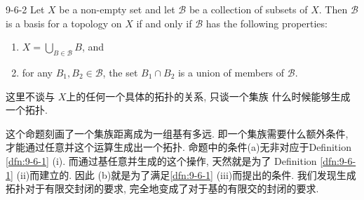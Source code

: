 \documentclass[../main.tex]{subfiles}
\begin{document}
\begin{proposition}{}{9-6-2}
Let $X$ be a non-empty set and let $\mathcal{B}$ be a collection of subsets of $X$. Then $\mathcal{B}$ is a basis for a topology on $X$ if and only if $\mathcal{B}$ has the following properties:
\begin{enumerate}
    \item[(a)] $X = \bigcup_{B \in \mathcal{B}} B$, and
    \item[(b)] for any $B_1, B_2 \in \mathcal{B}$, the set $B_1 \cap B_2$ is a union of members of $\mathcal{B}$.
\end{enumerate}
\end{proposition}
\begin{remark}
    这里不谈与 \(  X  \)上的任何一个具体的拓扑的关系, 只谈一个集族 什么时候能够生成一个拓扑. 
\end{remark}
\begin{note}
    这个命题刻画了一个集族距离成为一组基有多远. 即一个集族需要什么额外条件, 才能通过任意并这个运算生成出一个拓扑. 命题中的条件(a)无非对应于Definition \ref{dfn:9-6-1} (i). 而通过基任意并生成的这个操作, 天然就是为了 Definition \ref{dfn:9-6-1} (ii)而建立的. 因此 (b)就是为了满足\ref{dfn:9-6-1} (iii)而提出的条件. 我们发现生成拓扑对于有限交封闭的要求, 完全地变成了对于基的有限交的封闭的要求.
\end{note}
\end{document}
